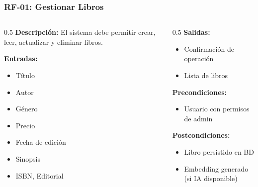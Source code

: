 \documentclass[aspectratio=169]{beamer}
\begin{document}
\begin{frame}
\frametitle{RF-01: Gestionar Libros}

\begin{columns}
\begin{column}{0.5\textwidth}
\textbf{Descripción:}
El sistema debe permitir crear, leer, actualizar y eliminar libros.

\textbf{Entradas:}
\begin{itemize}
\item Título
\item Autor
\item Género
\item Precio
\item Fecha de edición
\item Sinopsis
\item ISBN, Editorial
\end{itemize}
\end{column}

\begin{column}{0.5\textwidth}
\textbf{Salidas:}
\begin{itemize}
\item Confirmación de operación
\item Lista de libros
\end{itemize}

\textbf{Precondiciones:}
\begin{itemize}
\item Usuario con permisos de admin
\end{itemize}

\textbf{Postcondiciones:}
\begin{itemize}
\item Libro persistido en BD
\item Embedding generado (si IA disponible)
\end{itemize}
\end{column}
\end{columns}

\end{frame}
\end{document}
